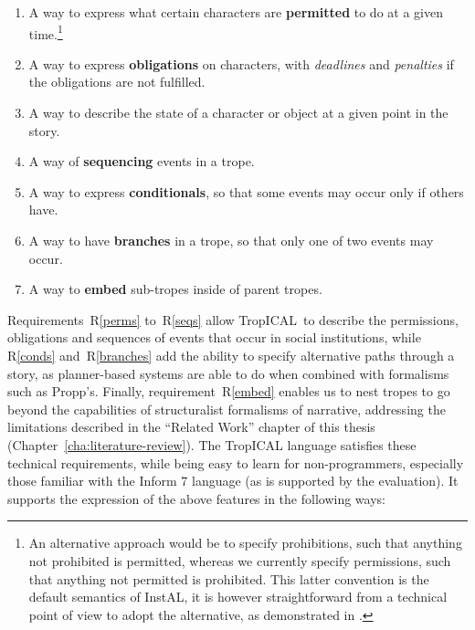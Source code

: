 \documentclass[11pt]{report}
\def\tropical{TropICAL}
\begin{document}
\begin{enumerate}[R1.]
\item\label{perms} A way to express what certain characters are \textbf{permitted} to do at a given time.\footnote{An alternative approach would be to specify prohibitions, such that anything not prohibited is permitted, whereas we currently specify permissions, such that anything not permitted is prohibited.  This latter convention is the default semantics of InstAL, it is however straightforward from a technical point of view to adopt the alternative, as demonstrated in \citet{DBLP:conf/atal/KingLVDJPR15}.}
\item\label{obls} A way to express \textbf{obligations} on characters, with \emph{deadlines} and \emph{penalties} if the obligations are not fulfilled.
\item\label{state} A way to describe the state of a character or object at a
  given point in the story.
\item\label{seqs} A way of \textbf{sequencing} events in a trope.
\item\label{conds} A way to express \textbf{conditionals}, so that some events may occur only if others have.
\item\label{branches} A way to have \textbf{branches} in a trope, so that only one of two events may occur.
\item\label{embed} A way to \textbf{embed} sub-tropes inside of parent tropes.
\end{enumerate}
Requirements~R\ref{perms} to~R\ref{seqs} allow \tropical\ to describe the
permissions, obligations and sequences of events that occur in social
institutions, while R\ref{conds} and~R\ref{branches} add the ability to specify
alternative paths through a story, as planner-based systems are able to do when
combined with formalisms such as Propp's. Finally, requirement~R\ref{embed}
enables us to nest tropes to go beyond the capabilities of structuralist
formalisms of narrative, addressing the limitations described in the ``Related
Work'' chapter of this thesis (Chapter~\ref{cha:literature-review}). The TropICAL language satisfies these technical requirements, while being easy to learn for non-programmers, especially those familiar with the Inform 7 language (as is supported by the evaluation). It supports the expression of the above features in the following ways: 
\end{document}
